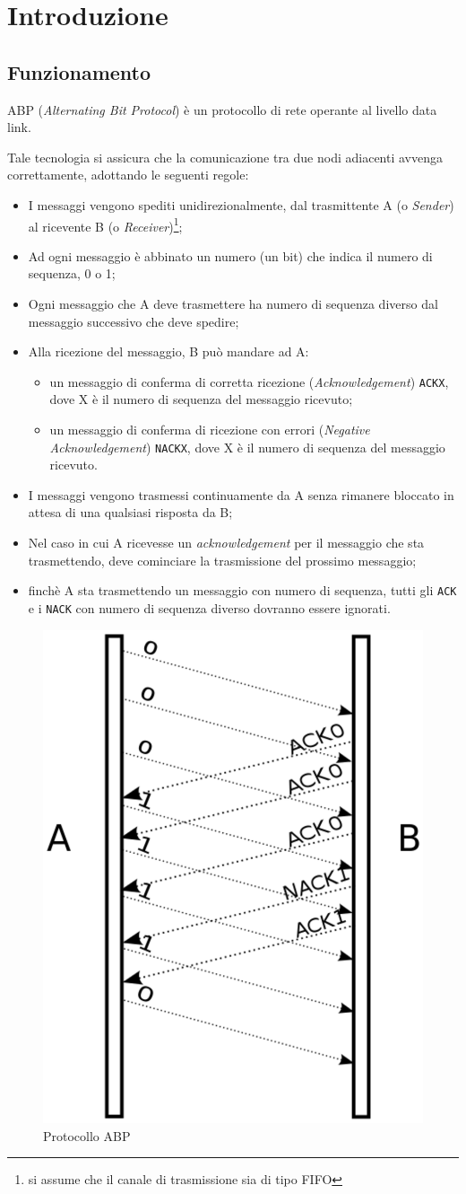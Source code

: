 \section{Introduzione}

\subsection{Funzionamento}\label{sec:intro}
ABP (\emph{Alternating Bit Protocol}) è un protocollo di rete operante al
livello data link.

Tale tecnologia si assicura che la comunicazione tra due nodi adiacenti avvenga
correttamente, adottando le seguenti regole:

\begin{itemize}
  \item I messaggi vengono spediti unidirezionalmente, dal
    trasmittente A (o \emph{Sender}) al ricevente B (o
    \emph{Receiver})\footnote{si assume che il canale di trasmissione sia di
    tipo FIFO};
  \item Ad ogni messaggio è abbinato un numero (un bit) che indica il numero di
    sequenza, 0 o 1;
  \item Ogni messaggio che A deve trasmettere ha numero di sequenza diverso dal
    messaggio successivo che deve spedire;
  \item Alla ricezione del messaggio, B può mandare ad A:
  \begin{itemize}
    \item un messaggio di conferma di corretta ricezione
      (\emph{Acknowledgement}) \texttt{ACKX}, dove X è il numero di sequenza
      del messaggio ricevuto;
    \item un messaggio di conferma di ricezione con errori
      (\emph{Negative Acknowledgement}) \texttt{NACKX}, dove X è il numero di
      sequenza del messaggio ricevuto.
  \end{itemize}
  \item I messaggi vengono trasmessi continuamente da A senza rimanere
    bloccato in attesa di una qualsiasi risposta da B;
  \item Nel caso in cui A ricevesse un \emph{acknowledgement} per il messaggio
    che sta trasmettendo, deve cominciare la trasmissione del prossimo
    messaggio;
  \item finchè A sta trasmettendo un messaggio con numero di sequenza, tutti
    gli \texttt{ACK} e i \texttt{NACK} con numero di sequenza diverso dovranno
    essere ignorati.
\end{itemize}

\begin{figure}[H]
  \centering
  \includegraphics[width=.5\columnwidth]{images/abp.eps}
  \caption{Protocollo ABP}
  \label{fig:graphic-abp}
\end{figure}
